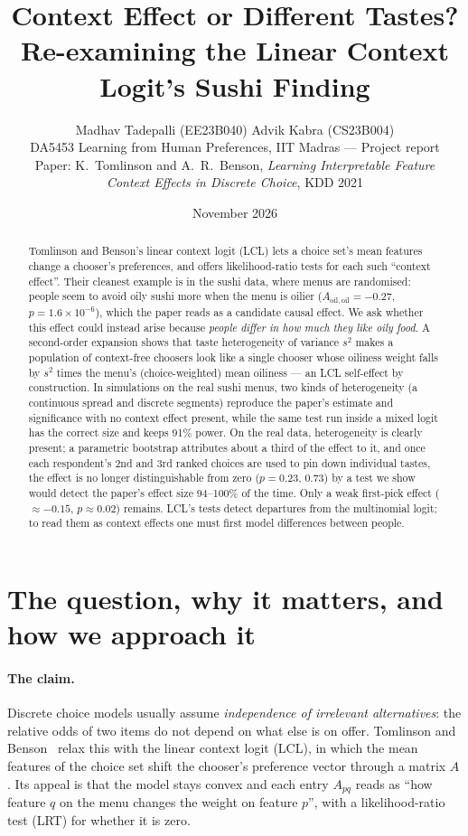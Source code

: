 \documentclass[11pt,a4paper]{article}
\title{\textbf{Context Effect or Different Tastes?}\\[2pt]
\large Re-examining the Linear Context Logit's Sushi Finding}
\author{Madhav Tadepalli (EE23B040) \quad Advik Kabra (CS23B004)\\[2pt]
\small DA5453 Learning from Human Preferences, IIT Madras --- Project report\\
\small Paper: K.~Tomlinson and A.~R.~Benson, \emph{Learning Interpretable Feature}\\
\small \emph{Context Effects in Discrete Choice}, KDD 2021}
\date{November 2026}
\theoremstyle{remark}
\newcommand{\Aoo}{A_{\mathrm{oil,oil}}}
\begin{document}
\maketitle

\begin{abstract}
\noindent
Tomlinson and Benson's linear context logit (LCL) lets a choice set's mean features change a
chooser's preferences, and offers likelihood-ratio tests for each such ``context effect''. Their
cleanest example is in the sushi data, where menus are randomised: people seem to avoid oily sushi
more when the menu is oilier ($\Aoo=-0.27$, $p=1.6\times10^{-6}$), which the paper reads as a
candidate causal effect. We ask whether this effect could instead arise because \emph{people differ in
how much they like oily food}. A second-order expansion shows that taste heterogeneity of variance
$s^2$ makes a population of context-free choosers look like a single chooser whose oiliness weight
falls by $s^2$ times the menu's (choice-weighted) mean oiliness --- an LCL self-effect by construction.
In simulations on the real sushi menus, two kinds of heterogeneity (a continuous spread and discrete
segments) reproduce the paper's estimate and significance with no context effect present, while the
same test run inside a mixed logit has the correct size and keeps 91\% power. On the real data,
heterogeneity is clearly present; a parametric bootstrap attributes about a third of the effect to it,
and once each respondent's 2nd and 3rd ranked choices are used to pin down individual tastes, the effect
is no longer distinguishable from zero ($p=0.23$, $0.73$) by a test we show would detect the paper's
effect size 94--100\% of the time. Only a weak first-pick effect ($\approx-0.15$, $p\approx0.02$)
remains. LCL's tests detect departures from the multinomial logit; to read them as context effects one
must first model differences between people.
\end{abstract}

\section{The question, why it matters, and how we approach it}
\label{sec:question}

\paragraph{The claim.}
Discrete choice models usually assume \emph{independence of irrelevant alternatives}: the relative
odds of two items do not depend on what else is on offer. Tomlinson and Benson~\cite{tb21} relax this
with the linear context logit (LCL), in which the mean features of the choice set shift the chooser's
preference vector through a matrix $A$. Its appeal is that the model stays convex and each entry
$A_{pq}$ reads as ``how feature $q$ on the menu changes the weight on feature $p$'', with a
likelihood-ratio test (LRT) for whether it is zero.
\end{document}
